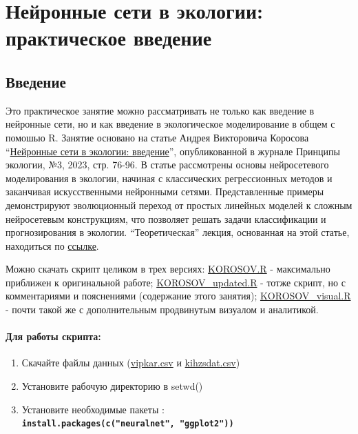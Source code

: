 \documentclass[
  letterpaper,
  DIV=11,
  numbers=noendperiod]{scrreprt}
\begin{document}

\chapter{Нейронные сети в экологии: практическое
введение}\label{ux43dux435ux439ux440ux43eux43dux43dux44bux435-ux441ux435ux442ux438-ux432-ux44dux43aux43eux43bux43eux433ux438ux438-ux43fux440ux430ux43aux442ux438ux447ux435ux441ux43aux43eux435-ux432ux432ux435ux434ux435ux43dux438ux435}

\section{Введение}\label{ux432ux432ux435ux434ux435ux43dux438ux435-1}

Это практическое занятие можно рассматривать не только как введение в
нейронные сети, но и как введение в экологическое моделирование в общем
с помошью R. Занятие основано на статье Андрея Викторовича Коросова
``\href{https://ecopri.ru/journal/article.php?id=14002}{Нейронные сети в
экологии: введение}'', опубликованной в журнале Принципы экологии, №3,
2023, стр. 76-96. В статье рассмотрены основы нейросетевого
моделирования в экологии, начиная с классических регрессионных методов и
заканчивая искусственными нейронными сетями. Представленные примеры
демонстрируют эволюционный переход от простых линейных моделей к сложным
нейросетевым конструкциям, что позволяет решать задачи классификации и
прогнозирования в экологии. ``Теоретическая'' лекция, основанная на этой
статье, находиться по \href{KOROSOV.ppt}{ссылке}.

Можно скачать скрипт целиком в трех версиях:
\href{https://mombus.github.io/cRab/data/KOROSOV.R}{KOROSOV.R} -
максимально приближен к оригинальной работе;
\href{https://mombus.github.io/cRab/data/KOROSOV_updated.R}{KOROSOV\_updated.R}
- тотже скрипт, но с комментариями и пояснениями (содержание этого
занятия);
\href{https://mombus.github.io/cRab/data/KOROSOV_visual.R}{KOROSOV\_visual.R}
- почти такой же с дополнительным продвинутым визуалом и аналитикой.

\subsubsection{\texorpdfstring{\textbf{Для работы
скрипта:}}{Для работы скрипта:}}\label{ux434ux43bux44f-ux440ux430ux431ux43eux442ux44b-ux441ux43aux440ux438ux43fux442ux430}

\begin{enumerate}
\def\labelenumi{\arabic{enumi}.}
\item
  Скачайте файлы данных
  (\href{https://mombus.github.io/cRab/data/vipkar.csv}{vipkar.csv} и
  \href{https://mombus.github.io/cRab/data/kihzsdat.csv}{kihzsdat.csv})
\item
  Установите рабочую директорию в setwd()
\item
  Установите необходимые пакеты :
  \textbf{\texttt{install.packages(c("neuralnet",\ "ggplot2"))}}
\end{enumerate}
\end{document}
